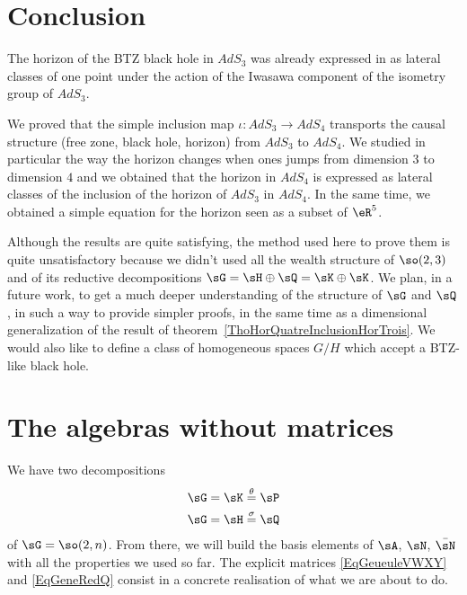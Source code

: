 \section{Conclusion}

The horizon of the BTZ black hole in $AdS_3$ was already expressed in \cite{Keio} as lateral classes of one point under the action of the Iwasawa component of the isometry group of $AdS_3$.

We proved that the simple inclusion map $\iota\colon AdS_3\to AdS_4$ transports the causal structure (free zone, black hole, horizon) from $AdS_3$ to $AdS_4$. We studied in particular the way the horizon changes when ones jumps from dimension $3$ to dimension $4$ and we obtained that the horizon in $AdS_4$ is expressed as lateral classes of the inclusion of the horizon of $AdS_3$ in $AdS_4$. In the same time, we obtained a simple equation for the horizon seen as a subset of $\eR^5$.

Although the results are quite satisfying, the method used here to prove them is quite unsatisfactory because we didn't used all the wealth structure of $\so(2,3)$ and of its reductive decompositions $\sG=\sH\oplus\sQ=\sK\oplus\sK$. We plan, in a future work, to get a much deeper understanding of the structure of $\sG$ and $\sQ$, in such a way to provide simpler proofs, in the same time as a dimensional generalization of the result of theorem~\ref{ThoHorQuatreInclusionHorTrois}. We would also like to define a class of homogeneous spaces $G/H$ which accept a BTZ-like black hole.
\section{The algebras without matrices}
\label{SecRebuildStructRoot}

We have two decompositions
\begin{equation}
	\begin{aligned}[]
		\sG&=\sK\stackrel{\theta}{=}\sP\\
		\sG&=\sH\stackrel{\sigma}{=}\sQ
	\end{aligned}
\end{equation}
of $\sG=\so(2,n)$. From there, we will build the basis elements of $\sA$, $\sN$, $\bar\sN$ with all the properties we used so far. The explicit matrices \eqref{EqGeueuleVWXY} and \eqref{EqGeneRedQ} consist in a concrete realisation of what we are about to do.

